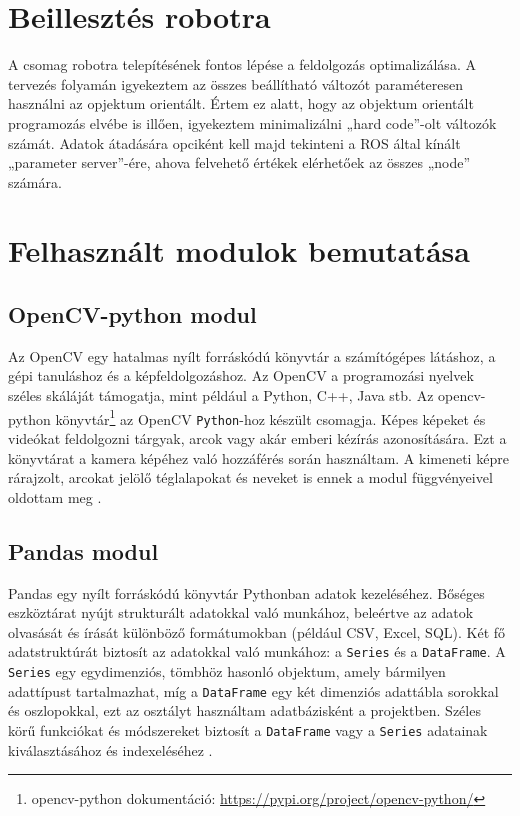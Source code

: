     
\section{Beillesztés robotra} %
A csomag robotra telepítésének fontos lépése a feldolgozás optimalizálása. A tervezés folyamán igyekeztem az összes beállítható változót paraméteresen használni az opjektum orientált. Értem ez alatt, hogy az objektum orientált programozás elvébe is illően, igyekeztem minimalizálni „hard code”-olt változók számát. Adatok átadására opciként kell majd tekinteni a ROS által kínált „parameter server”-ére, ahova felvehető értékek elérhetőek az összes „node” számára.
    
    
\section{Felhasznált modulok bemutatása}
\subsection{OpenCV-python modul}
Az OpenCV egy hatalmas nyílt forráskódú könyvtár a számítógépes látáshoz, a gépi tanuláshoz és a képfeldolgozáshoz. Az OpenCV a programozási nyelvek széles skáláját támogatja, mint például a Python, C++, Java stb. Az opencv-python könyvtár\footnote{opencv-python dokumentáció: \url{https://pypi.org/project/opencv-python/}} az OpenCV \verb|Python|-hoz készült csomagja. Képes képeket és videókat feldolgozni tárgyak, arcok vagy akár emberi kézírás azonosítására. Ezt a könyvtárat a kamera képéhez való hozzáférés során használtam. A kimeneti képre rárajzolt, arcokat jelölő téglalapokat és neveket is ennek a modul függvényeivel oldottam meg \cite{opencvpythoncite}.

\subsection{Pandas modul}
Pandas egy nyílt forráskódú könyvtár Pythonban adatok kezeléséhez. Bőséges eszköztárat nyújt strukturált adatokkal való munkához, beleértve az adatok olvasását és írását különböző formátumokban (például CSV, Excel, SQL). Két fő adatstruktúrát biztosít az adatokkal való munkához: a \verb|Series| és a \verb|DataFrame|. A \verb|Series| egy egydimenziós, tömbhöz hasonló objektum, amely bármilyen adattípust tartalmazhat, míg a \verb|DataFrame| egy két dimenziós adattábla sorokkal és oszlopokkal, ezt az osztályt használtam adatbázisként a projektben. Széles körű funkciókat és módszereket biztosít a \verb|DataFrame| vagy a \verb|Series| adatainak kiválasztásához és indexeléséhez \cite{pandas}.

